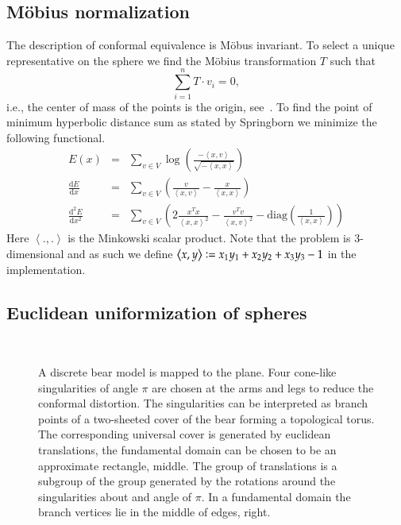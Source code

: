 \documentclass[Thesis]{subfiles}
\begin{document}
\subsection{M{\"o}bius normalization}
\label{sec:moebius_normalization}
The description of conformal equivalence is M{\"o}bus invariant.  
To select a unique representative on the sphere we find the M{\"o}bius transformation $T$ such that
\[\sum_{i=1}^{n}T\cdot v_i = 0,\]
i.e., the center of mass of the points is the origin, see~\cite{Springborn05}.
To find the point of minimum hyperbolic distance sum as stated by Springborn we minimize the following functional. 
\begin{eqnarray*} 
	E(x) &=& \sum_{v\in V}\log\left(\frac{-\left<x,v\right>}{\sqrt{-\left<x,x\right>}}\right)\\
	\frac{\mathrm d E}{\mathrm dx} &=& \sum_{v\in V}\left(\frac{v}{\left<x,v\right>} - \frac{x}{\left<x,x\right>}\right)\\
	\frac{\mathrm d^2 E}{\mathrm dx^2} &=& \sum_{v\in V}\left(2\frac{x^Tx}{\left<x,x\right>^2}-\frac{v^Tv}{\left<x,v\right>^2} - \mathrm{diag}\left(\frac{1}{\left<x,x\right>}\right)\right)
\end{eqnarray*}
Here $\left<.,.\right>$ is the Minkowski scalar product. Note that the problem is
 $3$-dimensional and as such we define $\left<x,y\right>\vcentcolon=x_1y_1+x_2y_2+x_3y_3-1$ in
the implementation.

\subsection{Euclidean uniformization of spheres}

\begin{figure}
\centering
{}\\
\caption{
A discrete bear model is mapped to the plane.
Four cone-like singularities of angle $\pi$ are chosen at the arms and legs to reduce the conformal distortion.
The singularities can be interpreted as branch points of a two-sheeted cover of the bear forming a topological torus.
The corresponding universal cover is generated by euclidean translations, the fundamental domain can be chosen to be an approximate rectangle, middle.
The group of translations is a subgroup of the group generated by the rotations around the singularities about and angle of $\pi$. In a fundamental domain the branch vertices lie in the middle of edges, right.
}
\label{fig:bear}
\end{figure}
\end{document}
